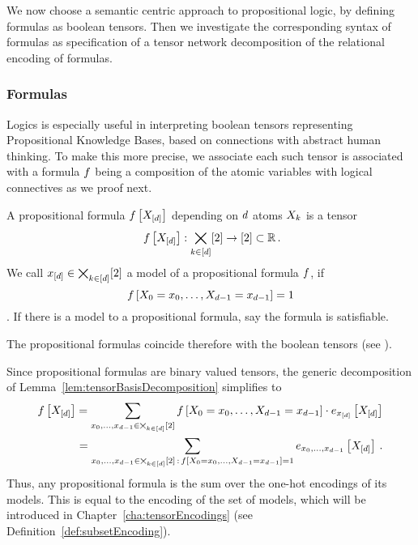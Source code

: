 We now choose a semantic centric approach to propositional logic, by defining formulas as boolean tensors.
Then we investigate the corresponding syntax of formulas as specification of a tensor network decomposition of the relational encoding of formulas.

\subsubsection{Formulas}

Logics is especially useful in interpreting boolean tensors representing Propositional Knowledge Bases, based on connections with abstract human thinking.
To make this more precise, we associate each such tensor is associated with a formula $f$ being a composition of the atomic variables with logical connectives as we proof next.

\begin{definition}\label{def:formulas}
	A propositional formula $f\left[X_{[d]}\right]$ depending on $d$ atoms $X_{k}$ is a tensor
		\[ \formulaat{\shortcatvariables} : \atomstates \rightarrow [2] \subset \rr \, . \]
	We call $x_{[d]} \in \bigtimes_{k\in[d]}[2]$ a model of a propositional formula $f$, if 
		\[ f\left[X_{0}=x_{0},\ldots,X_{d-1}=x_{d-1}\right]=1 \].
	If there is a model to a propositional formula, say the formula is satisfiable.
\end{definition}

The propositional formulas coincide therefore with the boolean tensors (see ).


Since propositional formulas are binary valued tensors, the generic decomposition of Lemma~\ref{lem:tensorBasisDecomposition} simplifies to
\begin{align}\label{eq:formulaModelDecomposition}
	f\left[X_{[d]}\right] = \sum_{x_{0},\ldots,x_{d-1}\in\bigtimes_{k\in[d]}[2]} f\left[X_{0}=x_{0},\ldots,X_{d-1}=x_{d-1}\right] \cdot e_{x_{[d]}}\left[X_{[d]}\right] \\
	= \sum_{x_{0},\ldots,x_{d-1}\in\bigtimes_{k\in[d]}[2] \, : \, f\left[X_{0}=x_{0},\ldots,X_{d-1}=x_{d-1}\right]=1}  e_{x_{0},\ldots,x_{d-1}}\left[X_{[d]}\right] \, .
\end{align}
Thus, any propositional formula is the sum over the one-hot encodings of its models.
This is equal to the encoding of the set of models, which will be introduced in Chapter~\ref{cha:tensorEncodings} (see Definition~\ref{def:subsetEncoding}).

